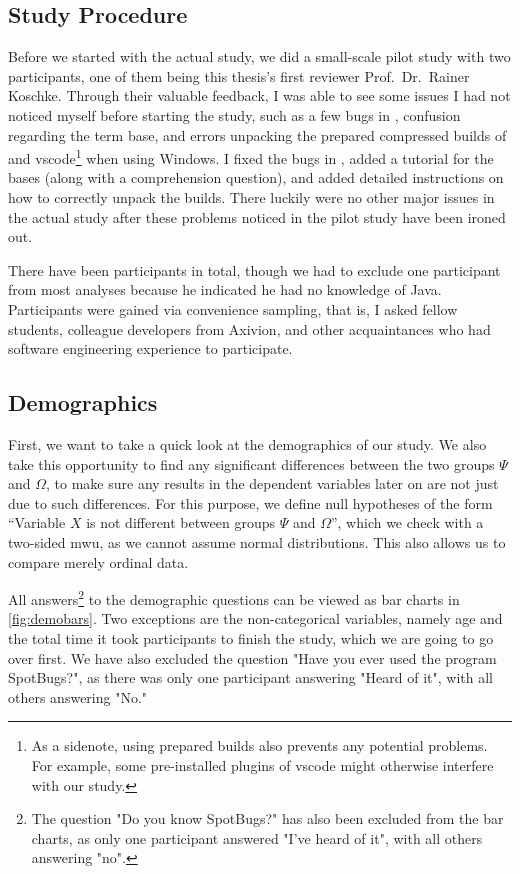\documentclass[../thesis]{subfiles}
\begin{document}
\subsection{Study Procedure}
Before we started with the actual study, we did a small-scale pilot study with two participants, one of them being this thesis's first reviewer Prof.\ Dr.\ Rainer Koschke.
Through their valuable feedback, I was able to see some issues I had not noticed myself before starting the study, such as a few bugs in \SEE{}, confusion regarding the term \gls{base}, and errors unpacking the prepared compressed builds of \SEE{} and \gls{vscode}\footnote{
	As a sidenote, using prepared builds also prevents any potential problems.
	For example, some pre-installed plugins of \gls{vscode} might otherwise interfere with our study.
} when using Windows.
I fixed the bugs in \SEE{}, added a tutorial for the \glspl{base} (along with a comprehension question), and added detailed instructions on how to correctly unpack the builds.
There luckily were no other major issues in the actual study after these problems noticed in the pilot study have been ironed out.

There have been \participants participants in total, though we had to exclude one participant from most analyses because he indicated he had no knowledge of Java.
Participants were gained via convenience sampling, that is, I asked fellow students, colleague developers from Axivion, and other acquaintances who had software engineering experience to participate.


\subsection{Demographics}

First, we want to take a quick look at the demographics of our study.
We also take this opportunity to find any significant differences between the two groups $\Psi$ and $\Omega$, to make sure any results in the dependent variables later on are not just due to such differences.
For this purpose, we define null hypotheses of the form \enquote{Variable $X$ is not different between groups $\Psi$ and $\Omega$}, which we check with a two-sided \gls{mwu}, as we cannot assume normal distributions.
This also allows us to compare merely ordinal data.

All answers\footnote{
	The question "Do you know SpotBugs?" has also been excluded from the bar charts, as only one participant answered "I've heard of it", with all others answering "no".
} to the demographic questions can be viewed as bar charts in \cref{fig:demobars}.
Two exceptions are the non-categorical variables, namely age and the total time it took participants to finish the study, which we are going to go over first.
We have also excluded the question "Have you ever used the program SpotBugs?", as there was only one participant answering "Heard of it", with all others answering "No."
\end{document}
